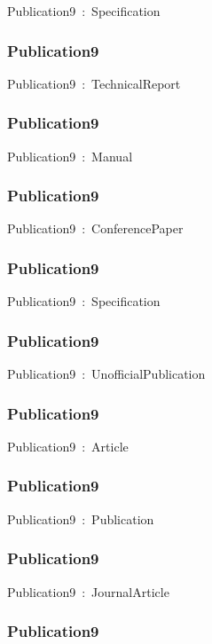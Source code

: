 \documentclass{article}
\begin{document}
Publication9~:~Specification

\subsubsection*{Publication9}

Publication9~:~TechnicalReport

\subsubsection*{Publication9}

Publication9~:~Manual

\subsubsection*{Publication9}

Publication9~:~ConferencePaper

\subsubsection*{Publication9}

Publication9~:~Specification

\subsubsection*{Publication9}

Publication9~:~UnofficialPublication

\subsubsection*{Publication9}

Publication9~:~Article

\subsubsection*{Publication9}

Publication9~:~Publication

\subsubsection*{Publication9}

Publication9~:~JournalArticle

\subsubsection*{Publication9}
\end{document}
